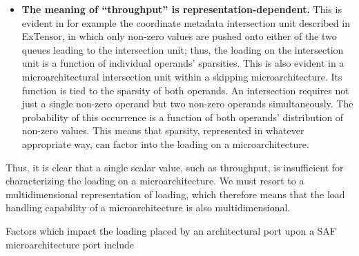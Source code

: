\begin{itemize}
\begin{itemize}
\begin{itemize}
\begin{itemize}
            \[w_{port\_out,nc} = w_{port\_in0,nc}\]

            \[w_{port\_out,nc} = w_{port\_in1,nc}\]

            where the $nc$ subscript refers to the dense rank size dimension (mnemonic ``nc'') of each port's workload.
        \end{itemize}
        \item \textbf{Projection relations.} The projection re
    \end{itemize}
\end{itemize}



(1) , and (2) a set of \textit{constitutive relations}  the ``workload vector'' abstraction developed in Section~\ref{sec:loadspaces}

\subsection{Deriving loadspaces from architecture and sparse optimizations}

TODO: describe how loadspaces are derived from architecture and sparse optimizations.

    \item \textbf{The meaning of ``throughput'' is representation-dependent.} This is evident in for example the coordinate metadata intersection unit described in ExTensor\cite{TODO}, in which only non-zero values are pushed onto either of the two queues leading to the intersection unit; thus, the loading on the intersection unit is a function of individual operands' sparsities. This is also evident in a microarchitectural intersection unit within a skipping microarchitecture. Its function is tied to the sparsity of both operands. An intersection requires not just a single non-zero operand but two non-zero operands simultaneously. The probability of this occurrence is a function of both operands' distribution of non-zero values. This means that sparsity, represented in whatever appropriate way, can factor into the loading on a microarchitecture.
\end{itemize}

Thus, it is clear that a single scalar value, such as throughput, is insufficient for characterizing the loading on a microarchitecture. We must resort to a multidimensional representation of loading, which therefore means that the load handling capability of a microarchitecture is also multidimensional.

Factors which impact the loading placed by an architectural port upon a SAF microarchitecture port include

